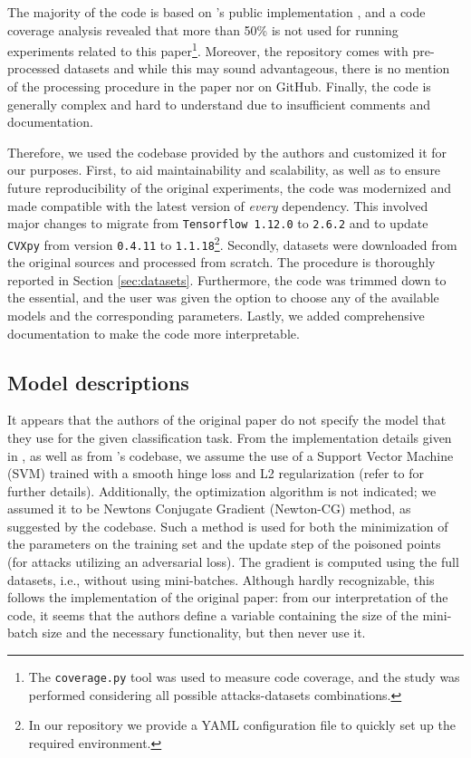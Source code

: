 The majority of the code is based on \citet{koh2018}'s public implementation \citep{koh2018_github}, and a code coverage analysis revealed that more than 50\% is not used for running experiments related to this paper\footnote{The \texttt{coverage.py} tool \citep{coverage_py} was used to measure code coverage, and the study was performed considering all possible attacks-datasets combinations.}. Moreover, the repository comes with pre-processed datasets and while this may sound advantageous, there is no mention of the processing procedure in the paper nor on GitHub. Finally, the code is generally complex and hard to understand due to insufficient comments and documentation.

Therefore, we used the codebase provided by the authors and customized it for our purposes. First, to aid maintainability and scalability, as well as to ensure future reproducibility of the original experiments, the code was modernized and made compatible with the latest version of \textit{every} dependency. This involved major changes to migrate from \texttt{Tensorflow 1.12.0} to \texttt{2.6.2} and to update \texttt{CVXpy} from version \texttt{0.4.11} to \texttt{1.1.18}\footnote{In our repository we provide a YAML configuration file to quickly set up the required environment.}. Secondly, datasets were downloaded from the original sources \citep{german_drug_dataset, compas_dataset} and processed from scratch. The procedure is thoroughly reported in Section \ref{sec:datasets}. Furthermore, the code was trimmed down to the essential, and the user was given the option to choose any of the available models and the corresponding parameters. Lastly, we added comprehensive documentation to make the code more interpretable.


\subsection{Model descriptions}
\label{sec:model_descriptions}

It appears that the authors of the original paper do not specify the model that they use for the given classification task. From the implementation details given in \citet{koh2018}, as well as from \citep{originalpaper}'s codebase, we assume the use of a Support Vector Machine (SVM) trained with a smooth hinge loss and L2 regularization (refer to \cite{koh2018} for further details). Additionally, the optimization algorithm is not indicated; we assumed it to be Newtons Conjugate Gradient (Newton-CG) method, as suggested by the codebase. Such a method is used for both the minimization of the parameters on the training set and the update step of the poisoned points (for attacks utilizing an adversarial loss). The gradient is computed using the full datasets, i.e., without using mini-batches. Although hardly recognizable, this follows the implementation of the original paper: from our interpretation of the code, it seems that the authors define a variable containing the size of the mini-batch size and the necessary functionality, but then never use it. 

